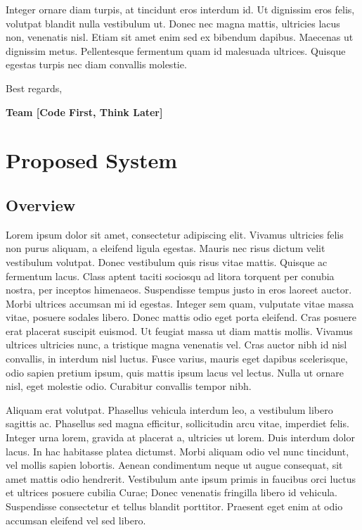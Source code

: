 \documentclass[12pt,letterpaper]{article}
\begin{document}
Integer ornare diam turpis, at tincidunt eros interdum id.
Ut dignissim eros felis, volutpat blandit nulla vestibulum ut. Donec
nec magna mattis, ultricies lacus non, venenatis nisl. Etiam sit amet
enim sed ex bibendum dapibus. Maecenas ut dignissim metus. Pellentesque
fermentum quam id malesuada ultrices. Quisque egestas turpis nec diam
convallis molestie.

\vspace{1em}

\noindent Best regards,

\vspace{1em}

\textbf{Team [Code First, Think Later]}

\newpage{}

\section{Proposed System}

\subsection{Overview}

Lorem ipsum dolor sit amet, consectetur adipiscing elit.
Vivamus ultricies felis non purus aliquam, a eleifend ligula egestas.
Mauris nec risus dictum velit vestibulum volutpat. Donec vestibulum
quis risus vitae mattis. Quisque ac fermentum lacus. Class aptent
taciti sociosqu ad litora torquent per conubia nostra, per inceptos
himenaeos. Suspendisse tempus justo in eros laoreet auctor. Morbi
ultrices accumsan mi id egestas. Integer sem quam, vulputate vitae
massa vitae, posuere sodales libero. Donec mattis odio eget porta
eleifend. Cras posuere erat placerat suscipit euismod. Ut feugiat
massa ut diam mattis mollis. Vivamus ultrices ultricies nunc, a tristique
magna venenatis vel. Cras auctor nibh id nisl convallis, in interdum
nisl luctus. Fusce varius, mauris eget dapibus scelerisque, odio sapien
pretium ipsum, quis mattis ipsum lacus vel lectus. Nulla ut ornare
nisl, eget molestie odio. Curabitur convallis tempor nibh.

Aliquam erat volutpat. Phasellus vehicula interdum leo, a
vestibulum libero sagittis ac. Phasellus sed magna efficitur, sollicitudin
arcu vitae, imperdiet felis. Integer urna lorem, gravida at placerat
a, ultricies ut lorem. Duis interdum dolor lacus. In hac habitasse
platea dictumst. Morbi aliquam odio vel nunc tincidunt, vel mollis
sapien lobortis. Aenean condimentum neque ut augue consequat, sit
amet mattis odio hendrerit. Vestibulum ante ipsum primis in faucibus
orci luctus et ultrices posuere cubilia Curae; Donec venenatis fringilla
libero id vehicula. Suspendisse consectetur et tellus blandit porttitor.
Praesent eget enim at odio accumsan eleifend vel sed libero.
\end{document}

